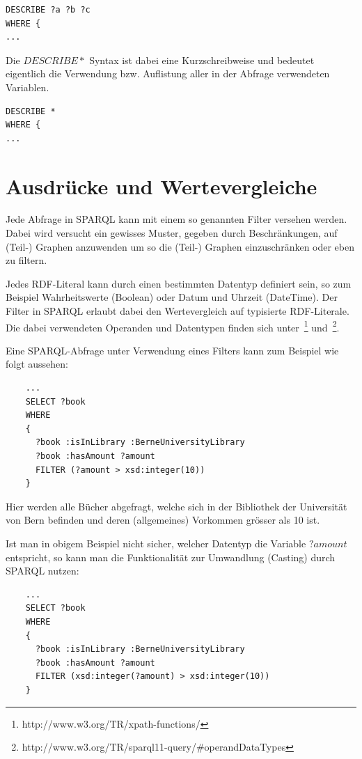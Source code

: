 \begin{lstlisting}
DESCRIBE ?a ?b ?c
WHERE {
...
\end{lstlisting}

Die $ DESCRIBE * $ Syntax ist dabei eine Kurzschreibweise und bedeutet eigentlich die Verwendung bzw. Auflistung aller in der Abfrage verwendeten Variablen. 
\begin{lstlisting}
DESCRIBE *
WHERE {
...
\end{lstlisting}

\section{Ausdrücke und Wertevergleiche}
\label{sec:sparql_ausdruecke}

Jede Abfrage in SPARQL kann mit einem so genannten Filter versehen werden. Dabei wird versucht ein gewisses Muster, gegeben durch Beschränkungen, auf (Teil-) Graphen anzuwenden um so die (Teil-) Graphen einzuschränken oder eben zu filtern.

Jedes RDF-Literal kann durch einen bestimmten Datentyp definiert sein, so zum Beispiel Wahrheitswerte (Boolean) oder Datum und Uhrzeit (DateTime). Der Filter in SPARQL erlaubt dabei den Wertevergleich auf typisierte RDF-Literale. Die dabei verwendeten Operanden und Datentypen finden sich unter~\footnote{http://www.w3.org/TR/xpath-functions/} und~\footnote{http://www.w3.org/TR/sparql11-query/\#operandDataTypes}.

Eine SPARQL-Abfrage unter Verwendung eines Filters kann zum Beispiel wie folgt aussehen:
\begin{lstlisting}
    ...
    SELECT ?book
    WHERE
    {
      ?book :isInLibrary :BerneUniversityLibrary
      ?book :hasAmount ?amount
      FILTER (?amount > xsd:integer(10))
    }
\end{lstlisting}
Hier werden alle Bücher abgefragt, welche sich in der Bibliothek der Universität von Bern befinden und deren (allgemeines) Vorkommen grösser als 10 ist.

Ist man in obigem Beispiel nicht sicher, welcher Datentyp die Variable $?amount$ entspricht, so kann man die Funktionalität zur Umwandlung (Casting) durch SPARQL nutzen:
\begin{lstlisting}
    ...
    SELECT ?book
    WHERE
    {
      ?book :isInLibrary :BerneUniversityLibrary
      ?book :hasAmount ?amount
      FILTER (xsd:integer(?amount) > xsd:integer(10))
    }
\end{lstlisting}

